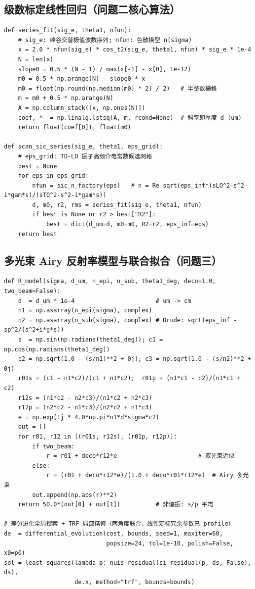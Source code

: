 \documentclass[11pt,a4paper,fontset=fandol]{ctexart}
\begin{document}
\subsection{级数标定线性回归（问题二核心算法）}
\begin{lstlisting}
def series_fit(sig_e, theta1, nfun):
    # sig_e: 峰谷交替极值波数序列; nfun: 色散模型 n(sigma)
    x = 2.0 * nfun(sig_e) * cos_t2(sig_e, theta1, nfun) * sig_e * 1e-4
    N = len(x)
    slope0 = 0.5 * (N - 1) / max(x[-1] - x[0], 1e-12)
    m0 = 0.5 * np.arange(N) - slope0 * x
    m0 = float(np.round(np.median(m0) * 2) / 2)   # 半整数栅格
    m = m0 + 0.5 * np.arange(N)
    A = np.column_stack([x, np.ones(N)])
    coef, *_ = np.linalg.lstsq(A, m, rcond=None)  # 斜率即厚度 d (um)
    return float(coef[0]), float(m0)

def scan_sic_series(sig_e, theta1, eps_grid):
    # eps_grid: TO-LO 振子高频介电常数候选网格
    best = None
    for eps in eps_grid:
        nfun = sic_n_factory(eps)   # n = Re sqrt(eps_inf*(sLO^2-s^2-i*gam*s)/(sTO^2-s^2-i*gam*s))
        d, m0, r2, rms = series_fit(sig_e, theta1, nfun)
        if best is None or r2 > best["R2"]:
            best = dict(d_um=d, m0=m0, R2=r2, eps_inf=eps)
    return best
\end{lstlisting}

\subsection{多光束 Airy 反射率模型与联合拟合（问题三）}
\begin{lstlisting}
def R_model(sigma, d_um, n_epi, n_sub, theta1_deg, deco=1.0, two_beam=False):
    d  = d_um * 1e-4                       # um -> cm
    n1 = np.asarray(n_epi(sigma), complex)
    n2 = np.asarray(n_sub(sigma), complex) # Drude: sqrt(eps_inf - sp^2/(s^2+i*g*s))
    s  = np.sin(np.radians(theta1_deg)); c1 = np.cos(np.radians(theta1_deg))
    c2 = np.sqrt(1.0 - (s/n1)**2 + 0j); c3 = np.sqrt(1.0 - (s/n2)**2 + 0j)
    r01s = (c1 - n1*c2)/(c1 + n1*c2);  r01p = (n1*c1 - c2)/(n1*c1 + c2)
    r12s = (n1*c2 - n2*c3)/(n1*c2 + n2*c3)
    r12p = (n2*c2 - n1*c3)/(n2*c2 + n1*c3)
    e = np.exp(1j * 4.0*np.pi*n1*d*sigma*c2)
    out = []
    for r01, r12 in [(r01s, r12s), (r01p, r12p)]:
        if two_beam:
            r = r01 + deco*r12*e                       # 双光束近似
        else:
            r = (r01 + deco*r12*e)/(1.0 + deco*r01*r12*e)  # Airy 多光束
        out.append(np.abs(r)**2)
    return 50.0*(out[0] + out[1])          # 非偏振: s/p 平均

# 差分进化全局搜索 + TRF 局部精修（两角度联合，线性定标冗余参数已 profile）
de  = differential_evolution(cost, bounds, seed=1, maxiter=60,
                             popsize=24, tol=1e-10, polish=False, x0=p0)
sol = least_squares(lambda p: nuis_residual(si_residual(p, ds, False), ds),
                    de.x, method="trf", bounds=bounds)
\end{lstlisting}
\end{document}
